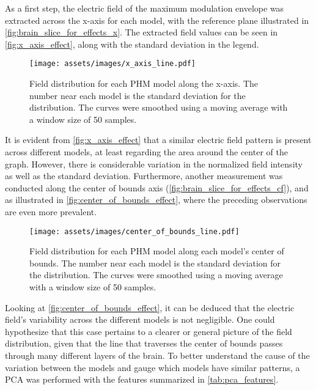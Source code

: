 As a first step, the electric field of the maximum modulation envelope was extracted across the x-axis for each model, with the reference plane illustrated in \autoref{fig:brain_slice_for_effects_x}. The extracted field values can be seen in \autoref{fig:x_axis_effect}, along with the standard deviation in the legend.

\begin{figure}[H]
    \centering
    \texttt{[image: assets/images/x\_axis\_line.pdf]}
    \caption{Field distribution for each \gls{PHM} model along the x-axis. The number near each model is the standard deviation for the distribution. The curves were smoothed using a moving average with a window size of 50 samples.}
    \label{fig:x_axis_effect}
\end{figure}

It is evident from \autoref{fig:x_axis_effect} that a similar electric field pattern is present across different models, at least regarding the area around the center of the graph. However, there is considerable variation in the normalized field intensity as well as the standard deviation. Furthermore, another measurement was conducted along the center of bounds axis (\autoref{fig:brain_slice_for_effects_cf}), and as illustrated in \autoref{fig:center_of_bounds_effect}, where the preceding observations are even more prevalent.

\begin{figure}[H]
    \centering
    \texttt{[image: assets/images/center\_of\_bounds\_line.pdf]}
    \caption{Field distribution for each \gls{PHM} model along each model's center of bounds. The number near each model is the standard deviation for the distribution. The curves were smoothed using a moving average with a window size of 50 samples.}
    \label{fig:center_of_bounds_effect}
\end{figure}

Looking at \autoref{fig:center_of_bounds_effect}, it can be deduced that the electric field's variability across the different models is not negligible. One could hypothesize that this case pertains to a clearer or general picture of the field distribution, given that the line that traverses the center of bounds passes through many different layers of the brain. 
To better understand the cause of the variation between the models and gauge which models have similar patterns, a \gls{PCA} was performed with the features summarized in \autoref{tab:pca_features}. 

